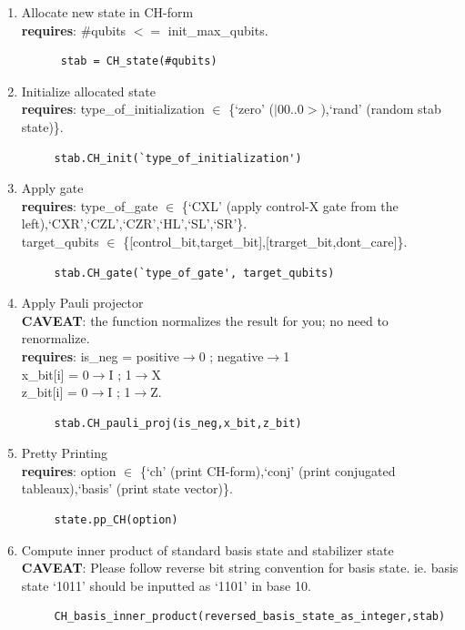 \documentclass[11pt]{article}
\newcommand{\blank}[1]{\hspace*{#1}}
\begin{document}
\begin{enumerate}
  \item Allocate new state in CH-form \\
 \textbf{ requires}: \#qubits $<=$ init\_max\_qubits.
  \begin{verbatim}
      stab = CH_state(#qubits) 
  \end{verbatim}
  
  \item Initialize allocated state\\
  \textbf{requires}: type\_of\_initialization $\in$ \{`zero' ($|$00..0$>$),`rand' (random stab state)\}.
  \begin{verbatim}
     stab.CH_init(`type_of_initialization')
  \end{verbatim}
  
  \item Apply gate\\
  \textbf{requires}: type\_of\_gate $\in$ \{`CXL' (apply control-X gate from the left),`CXR',`CZL',`CZR',`HL',`SL',`SR'\}.\\
  \blank{1.6cm}target\_qubits $\in$ \{[control\_bit,target\_bit],[trarget\_bit,dont\_care]\}.
  \begin{verbatim}
     stab.CH_gate(`type_of_gate', target_qubits)
  \end{verbatim}
  
  \item Apply Pauli projector \\
  \textbf{ CAVEAT}: the function normalizes the result for you; no need to renormalize.\\
  \textbf{requires}: is\_neg = positive$\rightarrow$0 ; negative$\rightarrow$1\\
  \blank{1.6cm}x\_bit[i] = 0$\rightarrow$I ; 1$\rightarrow$X \\
  \blank{1.6cm}z\_bit[i] = 0$\rightarrow$I ; 1$\rightarrow$Z. 
  \begin{verbatim}
     stab.CH_pauli_proj(is_neg,x_bit,z_bit)
  \end{verbatim}
  
    \item Pretty Printing \\
  \textbf{requires}: option $\in$ \{`ch' (print CH-form),`conj' (print conjugated tableaux),`basis' (print state vector)\}.
  \begin{verbatim}
     state.pp_CH(option) 
  \end{verbatim}
  
\item Compute inner product of standard basis state and stabilizer state\\
   \textbf{CAVEAT}: Please follow reverse bit string convention for basis state. ie. basis state `1011' should be inputted as `1101' in base 10.
  \begin{verbatim}
     CH_basis_inner_product(reversed_basis_state_as_integer,stab)
  \end{verbatim}  


\end{enumerate}
\end{document}
